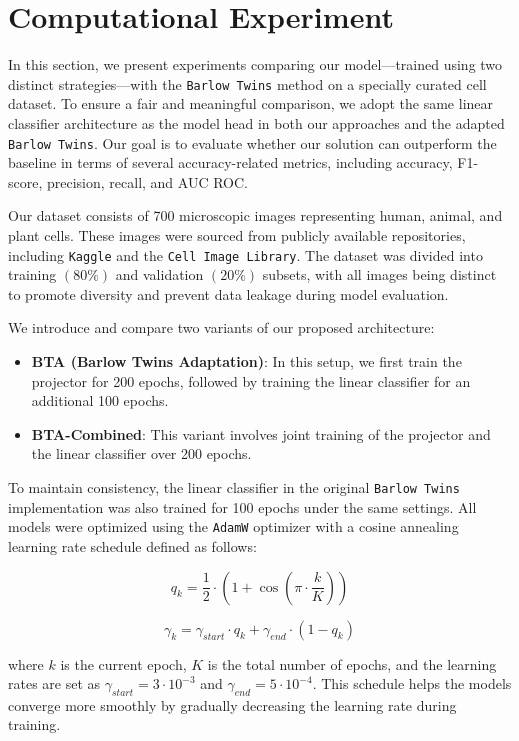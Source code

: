 \documentclass{article}
\begin{document}

\section{Computational Experiment}

In this section, we present experiments comparing our model—trained using two distinct strategies—with the \texttt{Barlow Twins} method on a specially curated cell dataset. To ensure a fair and meaningful comparison, we adopt the same linear classifier architecture as the model head in both our approaches and the adapted \texttt{Barlow Twins}. Our goal is to evaluate whether our solution can outperform the baseline in terms of several accuracy-related metrics, including accuracy, F1-score, precision, recall, and AUC ROC.

Our dataset consists of 700 microscopic images representing human, animal, and plant cells. These images were sourced from publicly available repositories, including \texttt{Kaggle} and the \texttt{Cell Image Library}. The dataset was divided into training $(80\%)$ and validation $(20\%)$ subsets, with all images being distinct to promote diversity and prevent data leakage during model evaluation.

We introduce and compare two variants of our proposed architecture:

\begin{itemize}
\item \textbf{BTA (Barlow Twins Adaptation)}: In this setup, we first train the projector for 200 epochs, followed by training the linear classifier for an additional 100 epochs.
\item \textbf{BTA-Combined}: This variant involves joint training of the projector and the linear classifier over 200 epochs.
\end{itemize}

To maintain consistency, the linear classifier in the original \texttt{Barlow Twins} implementation was also trained for 100 epochs under the same settings. All models were optimized using the \texttt{AdamW} optimizer with a cosine annealing learning rate schedule defined as follows:

$$ q_k = \frac{1}{2} \cdot (1 + \cos(\pi \cdot \frac{k}{K})) $$

$$ \gamma_{k} = \gamma_{start} \cdot q_k + \gamma_{end} \cdot (1 - q_k) $$

where $k$ is the current epoch, $K$ is the total number of epochs, and the learning rates are set as $\gamma_{start} = 3 \cdot 10^{-3}$ and $\gamma_{end} = 5 \cdot 10^{-4}$. This schedule helps the models converge more smoothly by gradually decreasing the learning rate during training.
\end{document}
